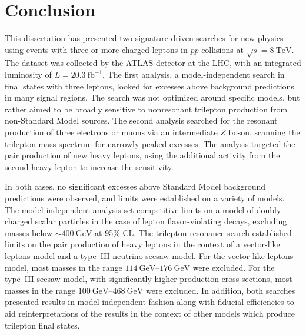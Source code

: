 \chapter{Conclusion}
This dissertation has presented two signature-driven searches for new physics using events with three or more charged leptons in $pp$ collisions at $\sqrt{s}=\SI{8}{\tera\electronvolt}$. The dataset was collected by the ATLAS detector at the LHC, with an integrated luminosity of $L=\SI{20.3}{\femto\barn\tothe{-1}}$. The first analysis, a model-independent search in final states with three leptons, looked for excesses above background predictions in many signal regions. The search was not optimized around specific models, but rather aimed to be broadly sensitive to nonresonant trilepton production from non-Standard Model sources. The second analysis searched for the resonant production of three electrons or muons via an intermediate $Z$ boson, scanning the trilepton mass spectrum for narrowly peaked excesses. The analysis targeted the pair production of new heavy leptons, using the additional activity from the second heavy lepton to increase the sensitivity. 

In both cases, no significant excesses above Standard Model background predictions were observed, and limits were established on a variety of models. The model-independent analysis set competitive limits on a model of doubly charged scalar particles in the case of lepton flavor-violating decays, excluding masses below $\sim\SI{400}{\giga\electronvolt}$ at 95\% CL. The trilepton resonance search established limits on the pair production of heavy leptons in the context of a vector-like leptons model and a type~III neutrino seesaw model. For the vector-like leptons model, most masses in the range $\SIrange[range-phrase=-]{114}{176}{\giga\electronvolt}$ were excluded. For the type~III seesaw model, with significantly higher production cross sections, most masses in the range $\SIrange[range-phrase=-]{100}{468}{\giga\electronvolt}$ were excluded. In addition, both searches presented results in model-independent fashion along with fiducial efficiencies to aid reinterpretations of the results in the context of other models which produce trilepton final states. 

